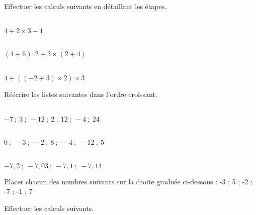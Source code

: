 
Effectuer les calculs suivants en détaillant les étapes.

\begin{multicols}{3}
    \cnt\\ 
    $4+2\times3-1$

    \cnt\\
    $(4+6):2+3\times (2+4)$

    \cnt\\
    $4+((-2+3)\times 2)\times 3$
\end{multicols}


Réécrire les listes suivantes dans l'ordre croissant.

\begin{multicols}{3}
    \cnt\\ 
    $-7~;~3~;~-12~;~2~;~12~;~-4~;~24$

    \cnt\\
    $0~;~-3~;~-2~;~8~;~-4~;~-12~;~5$

    \cnt\\
    $-7,2~;~-7,03~;~-7,1~;~-7,14~$
\end{multicols}


Placer chacun des nombres suivants sur la droite graduée ci-dessous :
-3 ; 5 ; -2 ; -7 ; -1 ; 7
\vspace{2em}

\begin{figure}[H]
    \centering
\end{figure}


Effectuer les calculs suivants. 

